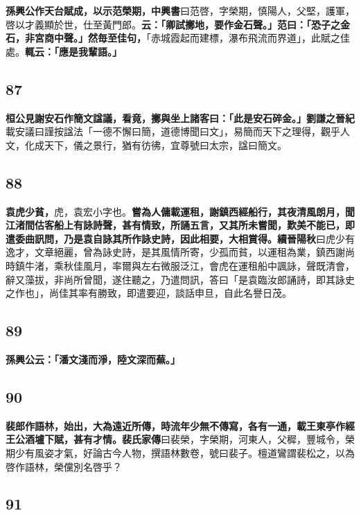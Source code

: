 \textbf{孫興公作天台賦成，以示范榮期，}{\footnotesize \textbf{中興書}曰范啓，字榮期，慎陽人，父堅，護軍，啓以才義顯於世，仕至黃門郎。}\textbf{云：「卿試擲地，要作金石聲。」范曰：「恐子之金石，非宮商中聲。」然毎至佳句，}{\footnotesize 「赤城霞起而建標，瀑布飛流而界道」，此賦之佳處。}\textbf{輒云：「應是我輩語。」}

\subsection*{87}

\textbf{桓公見謝安石作簡文諡議，看竟，擲與坐上諸客曰：「此是安石碎金。」}{\footnotesize \textbf{劉謙之晉紀}載安議曰謹按諡法「一德不懈曰簡，道德博聞曰文」，易簡而天下之理得，觀乎人文，化成天下，儀之景行，猶有彷彿，宜尊號曰太宗，諡曰簡文。}

\subsection*{88}

\textbf{袁虎少貧，}{\footnotesize 虎，袁宏小字也。}\textbf{嘗為人傭載運租，謝鎮西經船行，其夜清風朗月，聞江渚間估客船上有詠詩聲，甚有情致，所誦五言，又其所未嘗聞，歎美不能已，即遣委曲訊問，乃是袁自詠其所作詠史詩，因此相要，大相賞得。}{\footnotesize \textbf{續晉陽秋}曰虎少有逸才，文章絕麗，曾為詠史詩，是其風情所寄，少孤而貧，以運租為業，鎮西謝尚時鎮牛渚，乘秋佳風月，率爾與左右微服泛江，會虎在運租船中諷詠，聲既清會，辭又藻拔，非尚所曾聞，遂住聽之，乃遣問訊，答曰「是袁臨汝郎誦詩，即其詠史之作也」，尚佳其率有勝致，即遣要迎，談話申旦，自此名譽日茂。}

\subsection*{89}

\textbf{孫興公云：「潘文淺而淨，陸文深而蕪。」}

\subsection*{90}

\textbf{裴郎作語林，始出，大為遠近所傳，時流年少無不傳寫，各有一通，載王東亭作經王公酒壚下賦，甚有才情。}{\footnotesize \textbf{裴氏家傳}曰裴榮，字榮期，河東人，父穉，豐城令，榮期少有風姿才氣，好論古今人物，撰語林數卷，號曰裴子。檀道鸞謂裴松之，以為啓作語林，榮儻別名啓乎？}

\subsection*{91}

